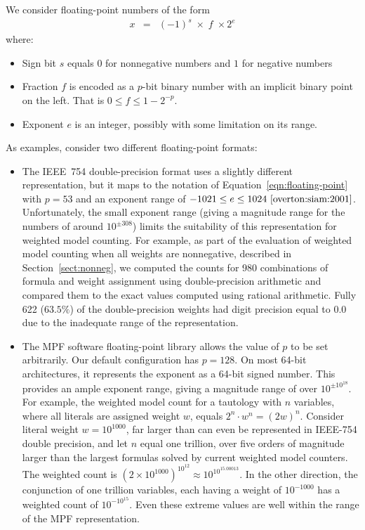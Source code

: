 \documentclass[letterpaper,USenglish,cleveref, autoref, thm-restate]{lipics-v2021}
\begin{document}
We consider floating-point numbers of the form
\begin{eqnarray}
x & = & (-1)^s \; \times \; f \; \times 2^{e} \label{eqn:floating-point}
\end{eqnarray}
where:
\begin{itemize}
\item Sign bit $s$ equals $0$ for nonnegative numbers and $1$ for negative numbers
\item Fraction $f$ is encoded as a $p$-bit binary number with an implicit binary point on the left.  That is $0 \leq f \leq 1-2^{-p}$.
\item Exponent $e$ is an integer, possibly with some limitation on its range.
\end{itemize}
As examples, consider two different floating-point formats:
\begin{itemize}
\item The IEEE~754 double-precision format uses a slightly different
  representation, but it maps to the notation of
  Equation~\ref{eqn:floating-point} with $p=53$ and an exponent range
  of $-1021 \leq e \leq 1024~\cite{overton:siam:2001}$.
  Unfortunately, the small exponent range (giving a magnitude range
  for the numbers of around $10^{\pm 308}$) limits the suitability of
  this representation for weighted model counting.  For example, as
  part of the evaluation of weighted model counting when all weights
  are nonnegative, described in Section~\ref{sect:nonneg}, we computed
  the counts for 980 combinations of formula and weight assignment
  using double-precision arithmetic and compared them to the exact
  values computed using rational arithmetic.  Fully 622 ($63.5\%$) of
  the double-precision weights had digit precision equal to $0.0$ due
  to the inadequate range of the representation.
\item The MPF software floating-point library allows the value of $p$
  to be set arbitrarily.  Our default configuration has $p=128$. On
  most 64-bit architectures, it represents the exponent as a 64-bit
  signed number.  This provides an ample exponent range, giving a
  magnitude range of over $10^{\pm 10^{18}}$.
  For example, the weighted model count for a tautology with $n$ variables, where all literals are assigned weight $w$, equals
  $2^n\cdot w^n = (2w)^n$.  Consider literal weight $w=10^{1000}$,
 far larger than can even be represented in IEEE-754 double precision, and let $n$ equal one trillion, over five orders of magnitude
 larger than the largest formulas solved by current weighted model counters.  The weighted count is
 $(2 \times 10^{1000})^{10^{12}} \approx 10^{10^{15.00013}}$.  In the other direction, the conjunction of one trillion variables, each having a weight
 of $10^{-1000}$ has a weighted count of $10^{-10^{15}}$.  Even these extreme values are
 well within the range of the MPF representation.
\end{itemize}
\end{document}
